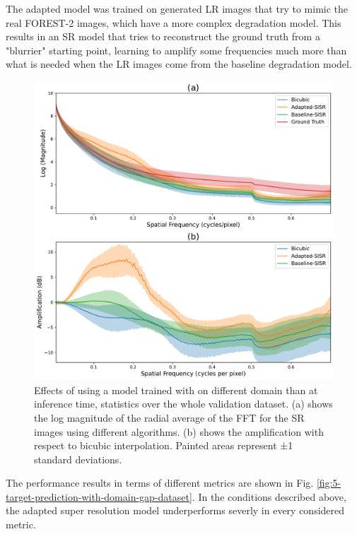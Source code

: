         The adapted model was trained on generated LR images that try to mimic the real FOREST-2 images, which have a more complex degradation model. This results in an SR model that tries to reconstruct the ground truth from a "blurrier" starting point, learning to amplify some frequencies much more than what is needed when the LR images come from the baseline degradation model.


        \begin{figure}[H]
            \centering
            \includegraphics[scale=0.4]{Includes/5-target-amplification-statistics-with-domain-gap.pdf}
            \caption{Effects of using a model trained with on different domain than at inference time, statistics over the whole validation dataset. 
                     (a) shows the log magnitude of the radial average of the FFT for the SR images using different algorithms.
                     (b) shows the amplification with respect to bicubic interpolation.
                     Painted areas represent ±1 standard deviations.
                     }
            \label{fig:5-target-amplification-statistics-with-domain-gap}
        \end{figure}

        The performance results in terms of different metrics are shown in Fig. \ref{fig:5-target-prediction-with-domain-gap-dataset}. 
        In the conditions described above, the adapted super resolution model underperforms severly in every considered metric.


